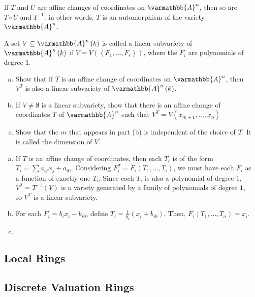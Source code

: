 \documentclass[10pt]{mypackage}
\renewcommand*{\mathbb}[1]{\varmathbb{#1}}
\newcommand{\A}{\mathbb{A}}
\begin{document}
If $T$ and $U$ are affine changes of coordinates on $\A^n$, then so are $T\circ U$ and $T^{-1}$; in other words, $T$ is an automorphism of the variety $\A^n$.
\begin{exercise}[Exercise 2.14]
A set $V\subseteq \A^n\left( k \right)$ is called a linear subvariety of $\A^n\left( k \right)$ if $V = V\left( \left\langle F_1,\dots,F_r \right\rangle \right)$, where the $F_i$ are polynomials of degree $1$.
\begin{enumerate}[(a)]
  \item Show that if $T$ is an affine change of coordinates on $\A^n$, then $V^T$ is also a linear subvariety of $\A^n\left( k \right)$.
  \item If $V\neq\emptyset$ is a linear subvariety, show that there is an affine change of coordinates $T$ of $\A^n$ such that $V^{T} = V\left( x_{m+1},\dots,x_n \right)$
  \item Show that the $m$ that appears in part (b) is independent of the choice of $T$. It is called the dimension of $V$.
\end{enumerate}
\end{exercise}
\begin{solution}\hfill
  \begin{enumerate}[(a)]
    \item If $T$ is an affine change of coordinates, then each $T_i$ is of the form $T_i = \sum a_{ij}x_j + a_{i0}$. Considering $F_i^T = F_i\left( T_1,\dots,T_i \right)$, we must have each $F_i$ as a function of exactly one $T_i$. Since each $T_i$ is also a polynomial of degree $1$, $V^T = T^{-1}\left( V \right)$ is a variety generated by a family of polynomials of degree $1$, so $V^T$ is a linear subvariety.
    \item For each $F_i = b_i x_i - b_{i0}$, define $T_i = \frac{1}{b_i}\left(  x_i + b_{i0} \right)$. Then, $F_i\left( T_1,\dots,T_n \right) = x_{i}$.
    \item 
  \end{enumerate}
\end{solution}

\subsection{Local Rings}%
\begin{exercise}[Exercise 2.17]

\end{exercise}
\begin{exercise}[Exercise 2.18]

\end{exercise}
\subsection{Discrete Valuation Rings}%
\end{document}
